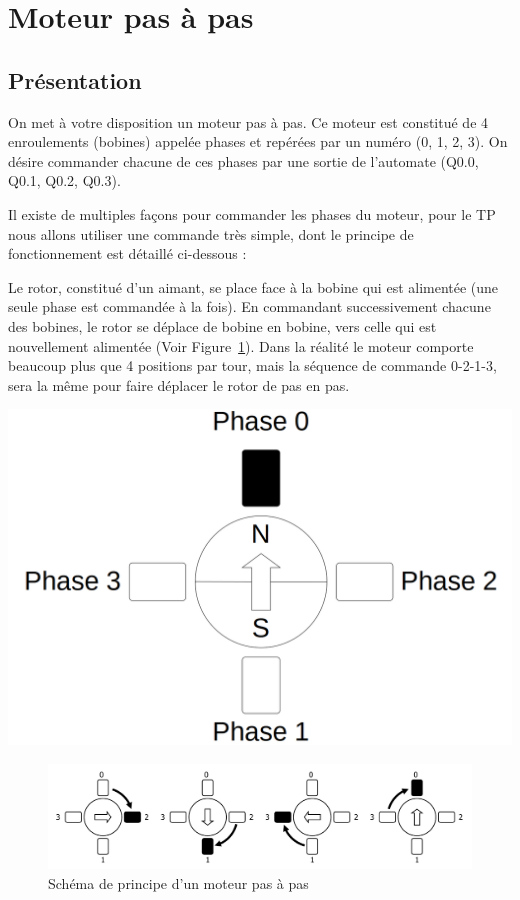 \documentclass[11pt]{article}
\begin{document}
\section{Moteur pas à pas}
\subsection{Présentation}
On met à votre disposition un moteur pas à pas.
Ce moteur est constitué de 4 enroulements (bobines) appelée phases et repérées par un numéro (0, 1, 2, 3). On désire commander chacune de ces phases par une sortie de l’automate (Q0.0, Q0.1, Q0.2, Q0.3). 

Il existe de multiples façons pour commander les phases du moteur, pour le TP nous allons utiliser une commande très simple, dont le principe de fonctionnement est détaillé ci-dessous : 

\begin{minipage}{.6\textwidth}
    Le rotor, constitué d’un aimant, se place face à la bobine qui
est alimentée (une seule phase est commandée à la fois).
En commandant successivement chacune des bobines, le
rotor se déplace de bobine en bobine, vers celle qui est
nouvellement alimentée (Voir Figure~\ref{fig:pasApas}). Dans la réalité le moteur comporte
beaucoup plus que 4 positions par tour, mais la séquence de
commande 0-2-1-3, sera la même pour faire déplacer le
rotor de pas en pas.
\end{minipage}\hfill
\begin{minipage}{.35\textwidth}
    \includegraphics[width=\textwidth]{images/pasAPas_01.png}
\end{minipage}


\begin{figure}[h]
    \centering
    \includegraphics[width=.8\textwidth]{images/pasAPas_02.png}
    \caption{Schéma de principe d'un moteur pas à pas}
    \label{fig:pasApas}
\end{figure}
\end{document}
